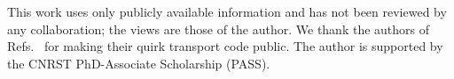 \documentclass[prd,twocolumn,nofootinbib,superscriptaddress,amsmath,amssymb]{revtex4-2}
\begin{document}
\begin{acknowledgments}
This work uses only publicly available information and has not been reviewed by any collaboration; the views are those of the author. We thank the authors of Refs.~\cite{QuirkPheno,Vami:2026} for making their quirk transport code public. The author is supported by the CNRST PhD-Associate Scholarship (PASS).
\end{acknowledgments}



\end{document}
